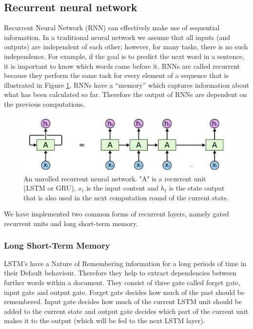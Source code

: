 \documentclass[8pt,conference,compsocconf]{IEEEtran}
\begin{document}
\subsection{Recurrent neural network}
Recurrent Neural Network (RNN) can effectively make use of sequential information. In a traditional neural network we assume that all inputs (and outputs) are independent of each other; however, for many tasks, there is no such independence. For example, if the goal is to predict the next word in a sentence, it is important to know which words came before it. RNNs are called recurrent because they perform the same task for every element of a sequence that is illustrated in Figure \ref{fig:rnn}. RNNs have a “memory” which captures information about what has been calculated so far. Therefore the output of RNNs are dependent on the previous computations.
	\begin{figure}[t]
	\centering
	\includegraphics[width=0.9 \linewidth]{fig/rnn.png}
	\caption{An unrolled recurrent neural network. "A" is a recurrent unit (LSTM or GRU), $x_t$ is the input content and $h_t$ is the state output that is also used in the next computation round of the current state.}
	\label{fig:rnn}
\end{figure}

We have implemented two common forms of recurrent layers, namely gated recurrent units and long short-term memory.
\subsubsection{Long Short-Term Memory}
LSTM’s have a Nature of Remembering information for a long periods of time in their Default behaviour. Therefore they help to extract dependencies between further words within a document. They consist of three gate called forget gate, input gate and output gate. Forget gate decides how much of the past should be remembered. Input gate decides how much of the current LSTM unit should be added to the current state and output gate decides which part of the current unit makes it to the output (which will be fed to the next LSTM layer). 
\end{document}
